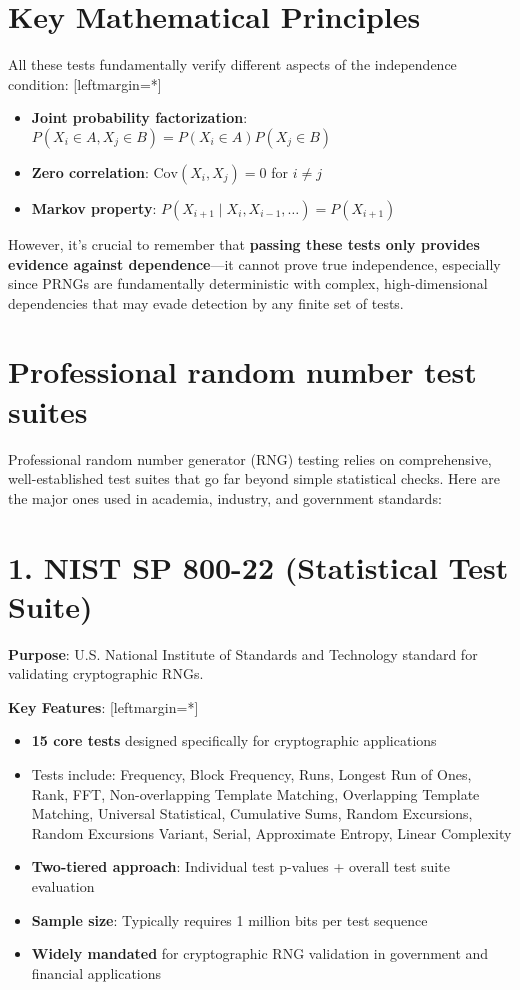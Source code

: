 \documentclass[12pt]{article}
\begin{document}
\section*{Key Mathematical Principles}

All these tests fundamentally verify different aspects of the independence condition:
[leftmargin=*] \begin{itemize}
    \item \textbf{Joint probability factorization}: $P(X_i \in A, X_j \in B) = P(X_i \in A)P(X_j \in B)$
    \item \textbf{Zero correlation}: $\text{Cov}(X_i, X_j) = 0$ for $i \neq j$
    \item \textbf{Markov property}: $P(X_{i+1} \mid X_i, X_{i-1}, \dots) = P(X_{i+1})$
\end{itemize}

However, it's crucial to remember that \textbf{passing these tests only provides evidence against dependence}---it cannot prove true independence, especially since PRNGs are fundamentally deterministic with complex, high-dimensional dependencies that may evade detection by any finite set of tests.


\section*{Professional random number test suites}

Professional random number generator (RNG) testing relies on comprehensive, well-established test suites that go far beyond simple statistical checks. Here are the major ones used in academia, industry, and government standards:

\section*{1. NIST SP 800-22 (Statistical Test Suite)}

\textbf{Purpose}: U.S. National Institute of Standards and Technology standard for validating cryptographic RNGs.

\textbf{Key Features}:
[leftmargin=*]
\begin{itemize}
    \item \textbf{15 core tests} designed specifically for cryptographic applications
    \item Tests include: Frequency, Block Frequency, Runs, Longest Run of Ones, Rank, FFT, Non-overlapping Template Matching, Overlapping Template Matching, Universal Statistical, Cumulative Sums, Random Excursions, Random Excursions Variant, Serial, Approximate Entropy, Linear Complexity
    \item \textbf{Two-tiered approach}: Individual test p-values + overall test suite evaluation
    \item \textbf{Sample size}: Typically requires 1 million bits per test sequence
    \item \textbf{Widely mandated} for cryptographic RNG validation in government and financial applications
\end{itemize}
\end{document}
